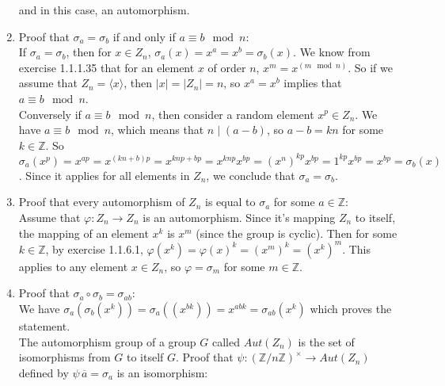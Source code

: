 \documentclass{article}
\newcommand{\Z}{\mathbb{Z}}
\newcommand{\olsi}[1]{\,\overline{\!{#1}}}
\begin{document}
\begin{enumerate}[label=\textbf{\alph*.}]
            and in this case, an automorphism.
        \item
            Proof that $\sigma_a = \sigma_b$
            if and only if $a \equiv b \mod n$: \\
            If $\sigma_a = \sigma_b$,
            then for $x \in Z_n$,
            $\sigma_a(x) = x^a = x^b = \sigma_b(x)$.
            We know from exercise 1.1.1.35 that for an element $x$ of
            order $n$, $x^m = x^{(m \mod n)}$.
            So if we assume that $Z_n = \langle x \rangle$,
            then $|x| = |Z_n| = n$,
            so $x^a = x^b$
            implies that $a \equiv b \mod n$. \\
            Conversely if $a \equiv b \mod n$,            
            then consider a random element $x^p \in Z_n$.
            We have $a \equiv b \mod n$,
            which means that $n \mid (a - b)$,
            so $a - b = kn$ for some $k \in \Z$.
            So $\sigma_a(x^p) = x^{ap}
            = x^{(kn + b)p}
            = x^{knp + bp}
            = x^{knp}x^{bp}
            = (x^n)^{kp}x^{bp}
            = 1^{kp}x^{bp}
            = x^{bp}
            = \sigma_b(x)$.
            Since it applies for all elements in $Z_n$,
            we conclude that $\sigma_a = \sigma_b$.
        \item
            Proof that every automorphism of $Z_n$ is equal
            to $\sigma_a$ for some $a \in \Z$: \\
            Assume that $\varphi:Z_n \to Z_n$ is an automorphism.
            Since it's mapping $Z_n$ to itself,
            the mapping of an element $x^k$ is $x^m$
            (since the group is cyclic).
            Then for some $k \in \Z$,
            by exercise 1.1.6.1,
            $\varphi(x^k) = \varphi(x)^k = (x^m)^k = (x^k)^m$.
            This applies to any element $x \in Z_n$,
            so $\varphi = \sigma_m$ for some $m \in \Z$. 
        \item
            Proof that $\sigma_a \circ \sigma_b = \sigma_{ab}$: \\
            We have $\sigma_a(\sigma_b(x^k))
            = \sigma_a((x^{bk}))
            = x^{abk}
            = \sigma_{ab}(x^k)$
            which proves the statement. \\
            The automorphism group of a group $G$ called $Aut(Z_n)$
            is the set of isomorphisms from $G$ to itself $G$.
            Proof that $\psi: (\Z/n\Z)^\times \to Aut(Z_n)$
            defined by $\psi{\olsi{a}} = \sigma_a$ is an isomorphism: \\

\end{enumerate}
\end{document}
